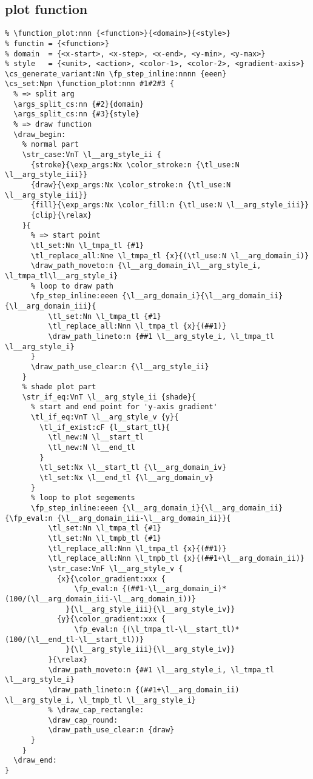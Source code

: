 \subsection{plot function}
\begin{verbatim}
% \function_plot:nnn {<function>}{<domain>}{<style>}
% functin = {<function>}
% domain  = {<x-start>, <x-step>, <x-end>, <y-min>, <y-max>}
% style   = {<unit>, <action>, <color-1>, <color-2>, <gradient-axis>}
\cs_generate_variant:Nn \fp_step_inline:nnnn {eeen}
\cs_set:Npn \function_plot:nnn #1#2#3 {
  % => split arg
  \args_split_cs:nn {#2}{domain}
  \args_split_cs:nn {#3}{style}
  % => draw function 
  \draw_begin:
    % normal part
    \str_case:VnT \l__arg_style_ii {
      {stroke}{\exp_args:Nx \color_stroke:n {\tl_use:N \l__arg_style_iii}}
      {draw}{\exp_args:Nx \color_stroke:n {\tl_use:N \l__arg_style_iii}}
      {fill}{\exp_args:Nx \color_fill:n {\tl_use:N \l__arg_style_iii}}
      {clip}{\relax}
    }{
      % => start point
      \tl_set:Nn \l_tmpa_tl {#1}
      \tl_replace_all:Nne \l_tmpa_tl {x}{(\tl_use:N \l__arg_domain_i)}
      \draw_path_moveto:n {\l__arg_domain_i\l__arg_style_i, \l_tmpa_tl\l__arg_style_i}
      % loop to draw path
      \fp_step_inline:eeen {\l__arg_domain_i}{\l__arg_domain_ii}{\l__arg_domain_iii}{
          \tl_set:Nn \l_tmpa_tl {#1}
          \tl_replace_all:Nnn \l_tmpa_tl {x}{(##1)}
          \draw_path_lineto:n {##1 \l__arg_style_i, \l_tmpa_tl \l__arg_style_i}
      }
      \draw_path_use_clear:n {\l__arg_style_ii}
    }
    % shade plot part
    \str_if_eq:VnT \l__arg_style_ii {shade}{
      % start and end point for 'y-axis gradient'
      \tl_if_eq:VnT \l__arg_style_v {y}{
        \tl_if_exist:cF {l__start_tl}{
          \tl_new:N \l__start_tl
          \tl_new:N \l__end_tl
        } 
        \tl_set:Nx \l__start_tl {\l__arg_domain_iv}
        \tl_set:Nx \l__end_tl {\l__arg_domain_v}
      }
      % loop to plot segements
      \fp_step_inline:eeen {\l__arg_domain_i}{\l__arg_domain_ii}{\fp_eval:n {\l__arg_domain_iii-\l__arg_domain_ii}}{
          \tl_set:Nn \l_tmpa_tl {#1}
          \tl_set:Nn \l_tmpb_tl {#1}
          \tl_replace_all:Nnn \l_tmpa_tl {x}{(##1)}
          \tl_replace_all:Nnn \l_tmpb_tl {x}{(##1+\l__arg_domain_ii)}
          \str_case:VnF \l__arg_style_v {
            {x}{\color_gradient:xxx {
                \fp_eval:n {(##1-\l__arg_domain_i)*(100/(\l__arg_domain_iii-\l__arg_domain_i))}
              }{\l__arg_style_iii}{\l__arg_style_iv}}
            {y}{\color_gradient:xxx {
                \fp_eval:n {(\l_tmpa_tl-\l__start_tl)*(100/(\l__end_tl-\l__start_tl))}
              }{\l__arg_style_iii}{\l__arg_style_iv}}
          }{\relax}
          \draw_path_moveto:n {##1 \l__arg_style_i, \l_tmpa_tl \l__arg_style_i}
          \draw_path_lineto:n {(##1+\l__arg_domain_ii) \l__arg_style_i, \l_tmpb_tl \l__arg_style_i}
          % \draw_cap_rectangle:
          \draw_cap_round:
          \draw_path_use_clear:n {draw}
      }
    }
  \draw_end:
}


\end{verbatim}
